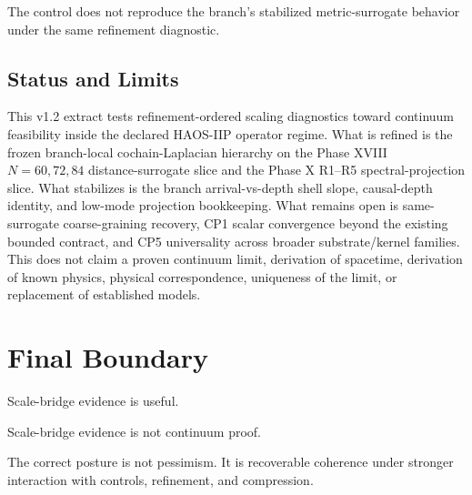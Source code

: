 \documentclass[11pt]{article}
\begin{document}
The control does not reproduce the branch's stabilized metric-surrogate behavior under the same refinement diagnostic.

\subsection{Status and Limits}

This v1.2 extract tests refinement-ordered scaling diagnostics toward continuum feasibility inside the declared HAOS-IIP operator regime. What is refined is the frozen branch-local cochain-Laplacian hierarchy on the Phase XVIII \(N=60,72,84\) distance-surrogate slice and the Phase X R1--R5 spectral-projection slice. What stabilizes is the branch arrival-vs-depth shell slope, causal-depth identity, and low-mode projection bookkeeping. What remains open is same-surrogate coarse-graining recovery, CP1 scalar convergence beyond the existing bounded contract, and CP5 universality across broader substrate/kernel families. This does not claim a proven continuum limit, derivation of spacetime, derivation of known physics, physical correspondence, uniqueness of the limit, or replacement of established models.

\section{Final Boundary}

Scale-bridge evidence is useful.

Scale-bridge evidence is not continuum proof.

The correct posture is not pessimism. It is recoverable coherence under stronger interaction with controls, refinement, and compression.
\end{document}
